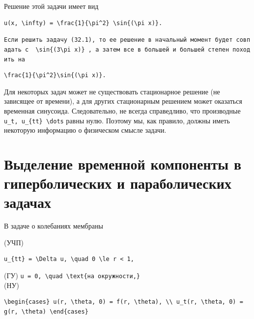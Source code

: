 \documentclass[
  ukrainian,
]{article}
\begin{document}
Решение этой задачи имеет вид

\begin{verbatim}
u(x, \infty) = \frac{1}{\pi^2} \sin{(\pi x)}.
\end{verbatim}

\texttt{Если\ решить\ задачу\ (32.1),\ то\ ее\ решение\ в\ начальный\ момент\ будет\ совпадать\ с\ \ \textquotesingle{}\textbackslash{}sin\{(3\textbackslash{}pi\ x)\}\textquotesingle{}\ ,\ а\ затем\ все\ в\ большей\ и\ большей\ степен\ походить\ на}

\begin{verbatim}
\frac{1}{\pi^2}\sin{(\pi x)}.
\end{verbatim}

Для некоторых задач может не существовать стационарное решение (не
зависящее от времени), а для других стационарным решением может
оказаться временная синусоида. Следовательно, не всегда справедливо, что
производные \texttt{u\_t,\ u\_\{tt\}\ \textbackslash{}dots} равны нулю.
Поэтому мы, как правило, должны иметь некоторую информацию о физическом
смысле задачи.

\section{Выделение временной компоненты в гиперболических и
параболических
задачах}\label{ux432ux44bux434ux435ux43bux435ux43dux438ux435-ux432ux440ux435ux43cux435ux43dux43dux43eux439-ux43aux43eux43cux43fux43eux43dux435ux43dux442ux44b-ux432-ux433ux438ux43fux435ux440ux431ux43eux43bux438ux447ux435ux441ux43aux438ux445-ux438-ux43fux430ux440ux430ux431ux43eux43bux438ux447ux435ux441ux43aux438ux445-ux437ux430ux434ux430ux447ux430ux445}

В задаче о колебаниях мембраны

(УЧП)

\begin{verbatim}
u_{tt} = \Delta u, \quad 0 \le r < 1,
\end{verbatim}

(ГУ)
\texttt{u\ =\ 0,\ \textbackslash{}quad\ \textbackslash{}text\{на\ окружности,\}}\\
(НУ)

\begin{verbatim}
\begin{cases} u(r, \theta, 0) = f(r, \theta), \\ u_t(r, \theta, 0) = g(r, \theta) \end{cases}
\end{verbatim}
\end{document}
